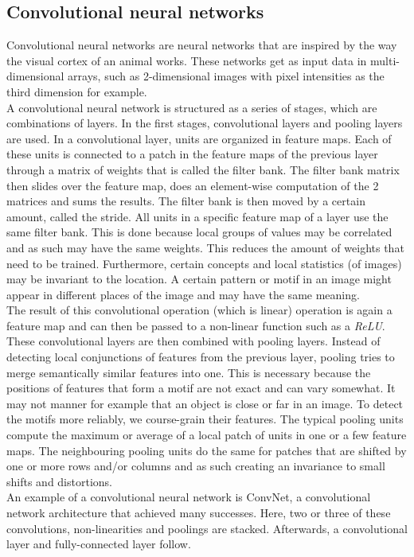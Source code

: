 \documentclass[a4paper]{article}
\begin{document}
\subsection{Convolutional neural networks}
Convolutional neural networks are neural networks that are inspired by the way the visual cortex of an animal works. These networks get as input data in multi-dimensional arrays, such as 2-dimensional images with pixel intensities as the third dimension for example.\\
A convolutional neural network is structured as a series of stages, which are combinations of layers. In the first stages, convolutional layers and pooling layers are used.
In a convolutional layer, units are organized in feature maps. Each of these units is connected to a patch in the feature maps of the previous layer through a matrix of weights that is called the filter bank. The filter bank matrix then slides over the feature map, does an element-wise computation of the 2 matrices and sums the results. The filter bank is then moved by a certain amount, called the stride. All units in a specific feature map of a layer use the same filter bank.
This is done because local groups of values may be correlated and as such may have the same weights. This reduces the amount of weights that need to be trained. Furthermore, certain concepts and local statistics (of images) may be invariant to the location. A certain pattern or motif in an image might appear in different places of the image and may have the same meaning.\\
The result of this convolutional operation (which is linear) operation is again a feature map and can then be passed to a non-linear function such as a \textit{ReLU}.\\

These convolutional layers are then combined with pooling layers. Instead of detecting local conjunctions of features from the previous layer, pooling tries to merge semantically similar features into one. This is necessary because the positions of features that form a motif are not exact and can vary somewhat. It may not manner for example that an object is close or far in an image. To detect the motifs more reliably, we course-grain their features. The typical pooling units compute the maximum or average of a local patch of units in one or a few feature maps. The neighbouring pooling units do the same for patches that are shifted by one or more rows and/or columns and as such creating an invariance to small shifts and distortions.\\
An example of a convolutional neural network is ConvNet, a convolutional network architecture that achieved many successes. Here, two or three of these convolutions, non-linearities and poolings are stacked. Afterwards, a convolutional layer and fully-connected layer follow.\\
\end{document}
